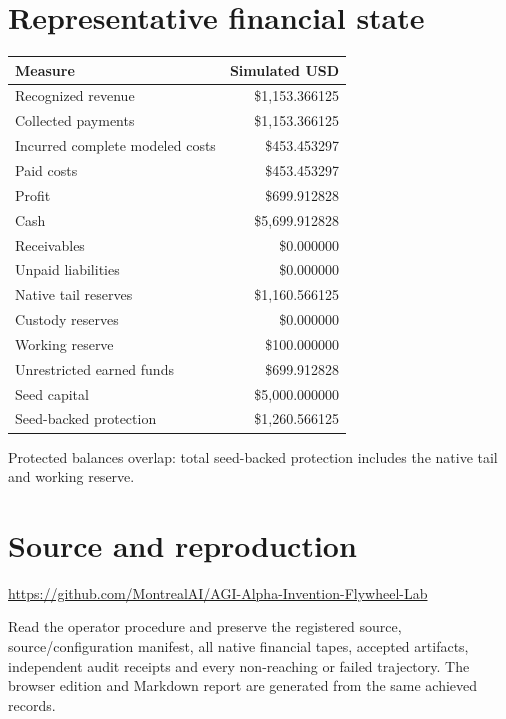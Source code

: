 \documentclass[10pt,letterpaper]{article}
\begin{document}
\clearpage\section{Representative financial state}
\begin{longtable}{@{}lr@{}}\toprule Measure & Simulated USD \\ \midrule\endhead
Recognized revenue & \$1,153.366125 \\
Collected payments & \$1,153.366125 \\
Incurred complete modeled costs & \$453.453297 \\
Paid costs & \$453.453297 \\
Profit & \$699.912828 \\
Cash & \$5,699.912828 \\
Receivables & \$0.000000 \\
Unpaid liabilities & \$0.000000 \\
Native tail reserves & \$1,160.566125 \\
Custody reserves & \$0.000000 \\
Working reserve & \$100.000000 \\
Unrestricted earned funds & \$699.912828 \\
Seed capital & \$5,000.000000 \\
Seed-backed protection & \$1,260.566125 \\
\bottomrule\end{longtable}
\small Protected balances overlap: total seed-backed protection includes the native tail and working reserve.\normalsize
\section{Source and reproduction}
\url{https://github.com/MontrealAI/AGI-Alpha-Invention-Flywheel-Lab}
\par Read the operator procedure and preserve the registered source, source/configuration manifest, all native financial tapes, accepted artifacts, independent audit receipts and every non-reaching or failed trajectory. The browser edition and Markdown report are generated from the same achieved records.
\end{document}

